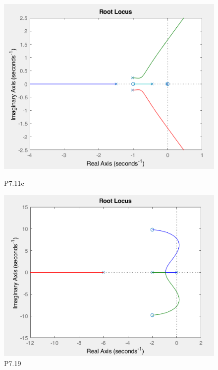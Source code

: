\documentclass{article}
\begin{document}
\begin{center}
		
		\begin{figure}
			\centering
			\begin{minipage}{.5\textwidth}
				\centering
				\includegraphics[width=1.00\linewidth]{11c}
				\caption{P7.11c}
			\end{minipage}%
			\begin{minipage}{.5\textwidth}
				\centering
				\includegraphics[width=1.00\linewidth]{19}
				\caption{P7.19}
			\end{minipage}
		\end{figure}
		

\end{center}
\end{document}
